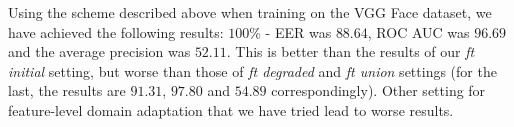 Using the scheme described above when training on the VGG Face dataset, we have achieved the following results: $100$\% - EER was $88.64$, ROC AUC was $96.69$ and the average precision was $52.11$. This is better than the results of our \textit{ft initial} setting, but worse than those of \textit{ft degraded} and \textit{ft union} settings (for the last, the results are $91.31$, $97.80$ and $54.89$ correspondingly). Other setting for feature-level domain adaptation that we have tried lead to worse results.






  
  
  
  
